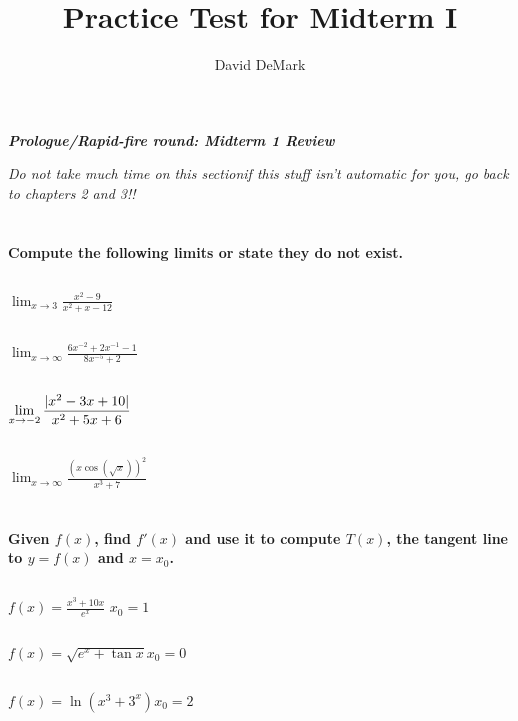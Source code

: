 \documentclass[english]{article}
\title{Practice Test for Midterm I}
\author{David DeMark}
\date{\due}
\DeclarePairedDelimiter\abs{\lvert}{\rvert}%
\newcommand{\prob}[1]{\setcounter{section}{#1-1}\section{}}
\newcommand{\prt}[1]{\setcounter{subsection}{#1-1}\subsection{}}
\theoremstyle{remark}
\theoremstyle{definition}
\newcommand{\ild}[1]{\displaystyle{#1}}
\begin{document}
	\begin{center}{\Large\textbf{\emph{Prologue/Rapid-fire round: Midterm 1 Review}}}\end{center}
	\emph{Do not take much time on this section\textemdash if this stuff isn't automatic for you, go back to chapters 2 and 3!!}

	\prob{-2} \textbf{Compute the following limits or state they do not exist.}
	\prt{1}$\ild{\lim_{x\to 3}\frac{x^2-9}{x^2+x-12}}$\vspace{2in}
	\vspace{1cm}
	\prt{2}$\ild{\lim_{x\to\infty}\frac{6x^{-2}+2x^{-1}-1}{8x^{-5}+2}}$\vspace{2in}
	\vspace{1cm}
	\prt{3} $\ild{\lim_{x\to -2}\frac{\abs{x^2-3x+10}}{x^2+5x+6}}$\vspace{2in}
\vspace{3cm}
\prt{4} $\ild{\lim_{x\to \infty} \frac{(x\cos(\sqrt{x}))^2}{x^3+7}}$\vspace{2in}
\vspace{1cm}
\prob{-1} \textbf{Given $f(x)$, find $f'(x)$ and use it to compute $T(x)$, the tangent line to $y=f(x)$ and $x=x_0$.}
\prt{1} $\ild{f(x)= \frac{x^3+10x}{e^x}}$
\newline$x_0=1$\vspace{2in}
%	


\prt{2} $\ild{f(x)=\sqrt{e^x+\tan{x}}}$\newline$x_0=0$\newpage
%	
\prt{3} $\ild{f(x)=\ln(x^3+3^x)}$\newline$x_0=2$\vspace{3in}
%	
\end{document}
